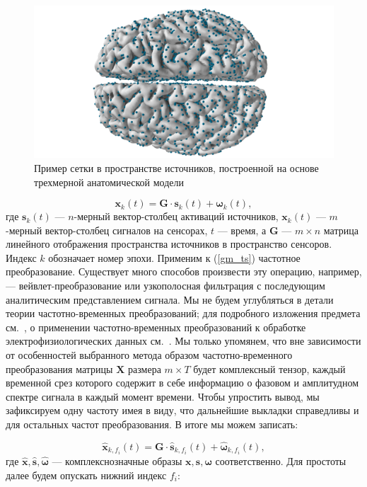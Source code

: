 \begin{figure}
\centering
\includegraphics[scale=0.3]{../images/brain.png}
\caption{Пример сетки в пространстве источников,
          построенной на основе трехмерной анатомической модели}\label{fig:src_space}
\end{figure}

\begin{equation}
    \mathbf{x}_k(t) = \mathbf{G} \cdot \mathbf{s}_k(t) + \mathbf{\omega}_k(t),
    \label{gm_ts}
\end{equation}
где $\mathbf{s}_k(t)$ --- $n$-мерный вектор-столбец активаций источников,
$\mathbf{x}_k(t)$ --- $m$-мерный вектор-столбец сигналов на сенсорах,
$t$ --- время, а $\mathbf{G}$ --- $m \times n$ матрица линейного отображения
пространства источников в пространство сенсоров.
Индекс $k$ обозначает номер эпохи.
Применим к (\ref{gm_ts}) частотное преобразование. Существует много способов произвести
эту операцию, например, --- вейвлет-преобразование или узкополосная фильтрация
с последующим аналитическим представлением сигнала.
Мы не будем углубляться в детали теории частотно-временных преобразований;
для подробного изложения предмета см.~\cite{Oppenheim1998},
о применении  частотно-временных преобразований к обработке
электрофизиологических данных см.~\cite{Freeman}.
Мы только упомянем, что вне зависимости от особенностей выбранного
метода образом частотно-временного преобразования матрицы $\mathbf{X}$ размера $m \times T$
будет комплексный тензор, каждый временной срез которого содержит в себе информацию
о фазовом и амплитудном спектре сигнала в каждый момент времени.
Чтобы упростить вывод, мы зафиксируем одну частоту имея в виду,
что дальнейшие выкладки справедливы и для остальных частот преобразования. В итоге мы можем записать:

\begin{equation}
    \hat{\mathbf{x}}_{k,f_i}(t) = \mathbf{G} \cdot \hat{\mathbf{s}}_{k,f_i}(t) + \hat{\mathbf{\omega}}_{k,f_i}(t),
    \label{gm_timefreq}
\end{equation}
где $\hat{\mathbf{x}}, \hat{\mathbf{s}}, \hat{\mathbf{\omega}}$ --- комплекснозначные образы $\mathbf{x}, \mathbf{s}, \mathbf{\omega}$ соответственно.
Для простоты далее будем опускать нижний индекс $f_i$:

